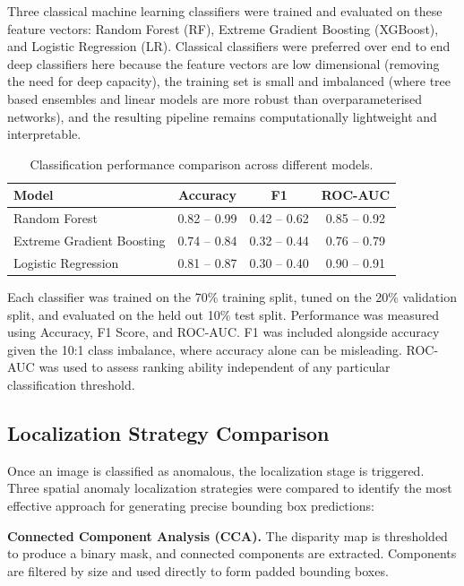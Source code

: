 \documentclass{bmvc2k}
\begin{document}
Three classical machine learning classifiers were trained and evaluated on these feature vectors: Random Forest (RF), Extreme Gradient Boosting (XGBoost), and Logistic Regression (LR). Classical classifiers were preferred over end to end deep classifiers here because the feature vectors are low dimensional (removing the need for deep capacity), the training set is small and imbalanced (where tree based ensembles and linear models are more robust than overparameterised networks), and the resulting pipeline remains computationally lightweight and interpretable.

\begin{table}
\begin{center}
\begin{tabular}{|l|c|c|c|}
\hline
Model & Accuracy & F1 & ROC-AUC \\
\hline\hline
Random Forest & 0.82 -- 0.99 & 0.42 -- 0.62 & 0.85 -- 0.92 \\
Extreme Gradient Boosting & 0.74 -- 0.84 & 0.32 -- 0.44 & 0.76 -- 0.79 \\
Logistic Regression & 0.81 -- 0.87 & 0.30 -- 0.40 & 0.90 -- 0.91 \\
\hline
\end{tabular}
\end{center}
\caption{Classification performance comparison across different models.}
\label{tab:results}
\end{table}

Each classifier was trained on the 70\% training split, tuned on the 20\% validation split, and evaluated on the held out 10\% test split. Performance was measured using Accuracy, F1 Score, and ROC-AUC. F1 was included alongside accuracy given the 10:1 class imbalance, where accuracy alone can be misleading. ROC-AUC was used to assess ranking ability independent of any particular classification threshold.

\subsection{Localization Strategy Comparison}

Once an image is classified as anomalous, the localization stage is triggered. Three spatial anomaly localization strategies were compared to identify the most effective approach for generating precise bounding box predictions:

\textbf{Connected Component Analysis (CCA).} The disparity map is thresholded to produce a binary mask, and connected components are extracted. Components are filtered by size and used directly to form padded bounding boxes.
\end{document}
